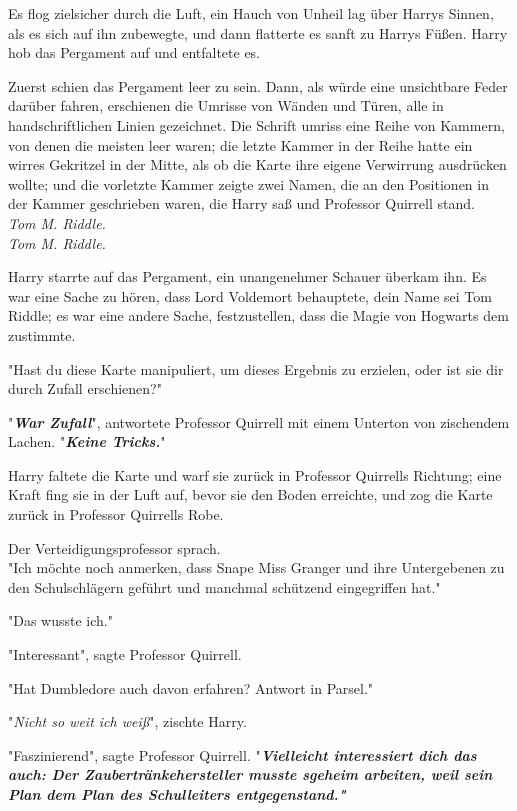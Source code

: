 {Es flog zielsicher durch die Luft, ein Hauch von Unheil lag über Harrys Sinnen, als es sich auf ihn zubewegte, und dann flatterte es sanft zu Harrys Füßen. Harry hob das Pergament auf und entfaltete es.

Zuerst schien das Pergament leer zu sein. Dann, als würde eine unsichtbare Feder darüber fahren, erschienen die Umrisse von Wänden und Türen, alle in handschriftlichen Linien gezeichnet. Die Schrift umriss eine Reihe von Kammern, von denen die meisten leer waren; die letzte Kammer in der Reihe hatte ein wirres Gekritzel in der Mitte, als ob die Karte ihre eigene Verwirrung ausdrücken wollte; und die vorletzte Kammer zeigte zwei Namen, die an den Positionen in der Kammer geschrieben waren, die Harry saß und Professor Quirrell stand.\\ \emph{\hfill\break Tom M. Riddle.}\\ \emph{Tom M. Riddle.}

Harry starrte auf das Pergament, ein unangenehmer Schauer überkam ihn. Es war eine Sache zu hören, dass Lord Voldemort behauptete, dein Name sei Tom Riddle; es war eine andere Sache, festzustellen, dass die Magie von Hogwarts dem zustimmte.

"Hast du diese Karte manipuliert, um dieses Ergebnis zu erzielen, oder ist sie dir durch Zufall erschienen?"

"\textbf{\emph{War Zufall}}", antwortete Professor Quirrell mit einem Unterton von zischendem Lachen. "\textbf{\emph{Keine Tricks.}}"

Harry faltete die Karte und warf sie zurück in Professor Quirrells Richtung; eine Kraft fing sie in der Luft auf, bevor sie den Boden erreichte, und zog die Karte zurück in Professor Quirrells Robe.

Der Verteidigungsprofessor sprach.\\ "Ich möchte noch anmerken, dass Snape Miss Granger und ihre Untergebenen zu den Schulschlägern geführt und manchmal schützend eingegriffen hat."

"Das wusste ich."

"Interessant", sagte Professor Quirrell.

"Hat Dumbledore auch davon erfahren? Antwort in Parsel."

"\emph{Nicht so weit ich weiß}", zischte Harry.

"Faszinierend", sagte Professor Quirrell. "\textbf{\emph{Vielleicht interessiert dich das auch: Der Zaubertränkehersteller musste sgeheim arbeiten, weil sein Plan dem Plan des Schulleiters entgegenstand."}}

}
